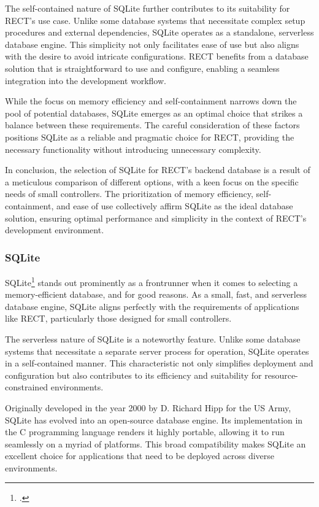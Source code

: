 The self-contained nature of SQLite further contributes to its suitability for RECT's use case. Unlike some database systems that necessitate complex setup 
procedures and external dependencies, SQLite operates as a standalone, serverless database engine. This simplicity not only facilitates ease of use but also 
aligns with the desire to avoid intricate configurations. RECT benefits from a database solution that is straightforward to use and configure, enabling a 
seamless integration into the development workflow.\newline

While the focus on memory efficiency and self-containment narrows down the pool of potential databases, SQLite emerges as an optimal choice that strikes a 
balance between these requirements. The careful consideration of these factors positions SQLite as a reliable and pragmatic choice for RECT, providing the 
necessary functionality without introducing unnecessary complexity.\newline

In conclusion, the selection of SQLite for RECT's backend database is a result of a meticulous comparison of different options, with a keen focus on the 
specific needs of small controllers. The prioritization of memory efficiency, self-containment, and ease of use collectively affirm SQLite as the ideal database 
solution, ensuring optimal performance and simplicity in the context of RECT's development environment.

\subsubsection{SQLite}
SQLite\footcite{sqlite} stands out prominently as a frontrunner when it comes to selecting a memory-efficient database, and for good reasons. As a small, fast, 
and serverless database engine, SQLite aligns perfectly with the requirements of applications like RECT, particularly those designed for small controllers.\newline

The serverless nature of SQLite is a noteworthy feature. Unlike some database systems that necessitate a separate server process for operation, SQLite operates 
in a self-contained manner. This characteristic not only simplifies deployment and configuration but also contributes to its efficiency and suitability for 
resource-constrained environments.\newline

Originally developed in the year 2000 by D. Richard Hipp for the US Army, SQLite has evolved into an open-source database engine. Its implementation in the C 
programming language renders it highly portable, allowing it to run seamlessly on a myriad of platforms. This broad compatibility makes SQLite an excellent 
choice for applications that need to be deployed across diverse environments.\newline

